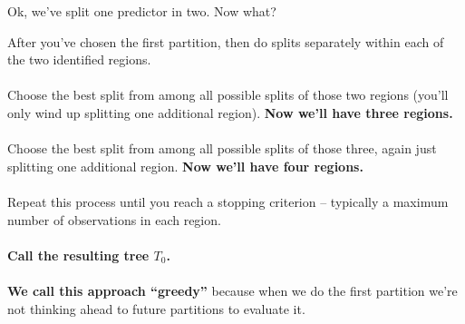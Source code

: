 \documentclass[mathserif, aspectratio=169]{beamer}
\begin{document}
\begin{frame}{Ok, we've split one predictor in two.  Now what?}

After you've chosen the first partition, then do splits separately within each of the two identified regions.  \\~\\

Choose the best split from among all possible splits of those two regions (you'll only wind up splitting one additional region).  \textbf{Now we'll have three regions.}\\~\\

Choose the best split from among all possible splits of those three, again just splitting one additional region.  \textbf{Now we'll have four regions.}\\~\\

Repeat this process until you reach a stopping criterion -- typically a maximum number of observations in each region.  \\~\\ \textbf{Call the resulting tree $T_0$.} \\~\\

\textbf{We call this approach ``greedy''} because when we do the first partition we're not thinking ahead to future partitions to evaluate it.  
\end{frame}
\end{document}
